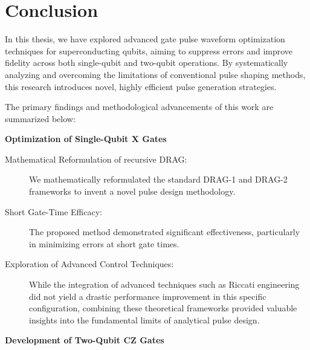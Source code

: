 \section{Conclusion}
In this thesis, we have explored advanced gate pulse waveform optimization techniques for superconducting qubits, aiming
to suppress errors and improve fidelity across both single-qubit and two-qubit operations. By systematically analyzing
and overcoming the limitations of conventional pulse shaping methods, this research introduces novel, highly efficient
pulse generation strategies.

The primary findings and methodological advancements of this work are summarized below:

\noindent\textbf{Optimization of Single-Qubit X Gates}

\begin{description}
  \item[Mathematical Reformulation of recursive DRAG: ] We mathematically reformulated the standard DRAG-1 and DRAG-2 frameworks to invent a novel pulse design methodology.

  \item[Short Gate-Time Efficacy: ]The proposed method demonstrated significant effectiveness, particularly in minimizing errors at short gate times.

  \item[Exploration of Advanced Control Techniques: ]While the integration of advanced techniques such as Riccati engineering did not yield a drastic performance improvement in this specific configuration, combining these theoretical frameworks provided valuable insights into the fundamental limits of analytical pulse design.
\end{description}

\noindent\textbf{Development of Two-Qubit CZ Gates}

